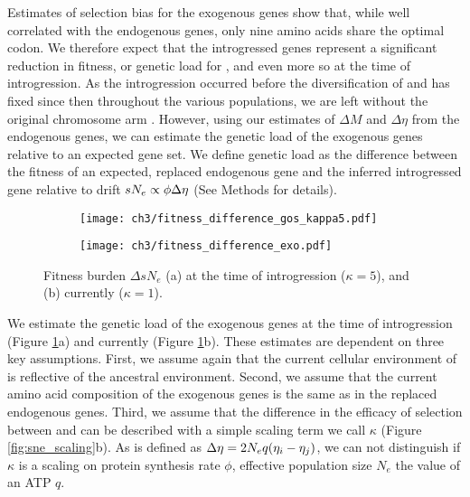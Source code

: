Estimates of selection bias for the exogenous genes show that, while well correlated with the endogenous genes, only nine amino acids share the optimal codon.
We therefore expect that the introgressed genes represent a significant reduction in fitness, or genetic load for \kluyveri, and even more so at the time of introgression.
As the introgression occurred before the diversification of \kluyveri and has fixed since then throughout the various populations, we are left without the original chromosome arm \citep{friedrich2015}.
However, using our estimates of $\Delta M$ and $\Delta \eta$ from the endogenous genes, we can estimate the genetic load of the exogenous genes relative to an expected gene set.
We define genetic load as the difference between the fitness of an expected, replaced endogenous gene and the inferred introgressed gene relative to drift $sN_e \propto \phi {\Delta \eta}$ (See Methods for details).
\begin{figure}[h]
    \centering
    \begin{subfigure}
        \centering
        \texttt{[image: ch3/fitness\_difference\_gos\_kappa5.pdf]}
    \end{subfigure}
    \begin{subfigure}
        \centering
        \texttt{[image: ch3/fitness\_difference\_exo.pdf]}
    \end{subfigure}
    \caption{Fitness burden $\Delta sN_e$ (a) at the time of introgression ($\kappa = 5$), and (b) currently ($\kappa = 1$). }
    \label{fig:sne_fitness_burden}
\end{figure}

We estimate the genetic load of the exogenous genes at the time of introgression (Figure \ref{fig:sne_fitness_burden}a) and currently (Figure \ref{fig:sne_fitness_burden}b).
These estimates are dependent on three key assumptions.
First, we assume again that the current cellular environment of \gossypii is reflective of the ancestral environment.
Second, we assume that the current amino acid composition of the exogenous genes is the same as in the replaced endogenous genes.
Third, we assume that the difference in the efficacy of selection between \gossypii and \kluyveri can be described with a simple scaling term we call $\kappa$ (Figure \ref{fig:sne_scaling}b).
As \DE is defined as ${\Delta \eta} = 2N_eq(\eta_i-\eta_j)$, we can not distinguish if $\kappa$ is a scaling on protein synthesis rate $\phi$, effective population size $N_e$ the value of an ATP $q$\citep{gilchrist2015}.

